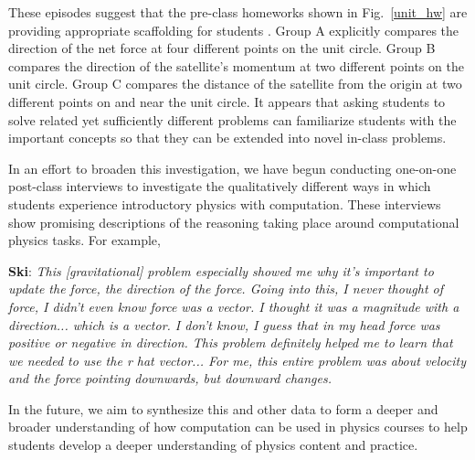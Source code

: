 \documentclass{msuphddissertation}
\begin{document}
\begin{doublespace}
These episodes suggest that the pre-class homeworks shown in Fig.~\ref{unit_hw} are providing appropriate scaffolding for students \cite{vyg}.  Group A explicitly compares the direction of the net force at four different points on the unit circle.  Group B compares the direction of the satellite's momentum at two different points on the unit circle.  Group C compares the distance of the satellite from the origin at two different points on and near the unit circle.  It appears that asking students to solve related yet sufficiently different problems can familiarize students with the important concepts so that they can be extended into novel in-class problems.%


In an effort to broaden this investigation, we have begun conducting one-on-one post-class interviews to investigate the qualitatively different ways in which students experience introductory physics with computation.  These interviews show promising descriptions of the reasoning taking place around computational physics tasks.  For example,

\vspace*{4pt}
\noindent\textbf{Ski}: {\it This [gravitational] problem especially showed me why it's important to update the force, the direction of the force. Going into this, I never thought of force, I didn't even know force was a vector. I thought it was a magnitude with a direction... which is a vector. I don't know, I guess that in my head force was positive or negative in direction. This problem definitely helped me to learn that we needed to use the r hat vector... For me, this entire problem was about velocity and the force pointing downwards, but downward changes.}
\vspace*{4pt}

In the future, we aim to synthesize this and other data to form a deeper and broader understanding of how computation can be used in physics courses to help students develop a deeper understanding of physics content and practice.


\end{doublespace}
\end{document}
